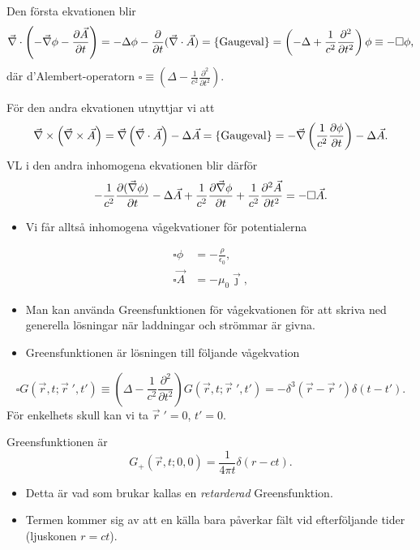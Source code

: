\documentclass[%
oneside,                 %
final,                   %
10pt]{article}
\begin{document}
\noindent
Den första ekvationen blir
$$
\vec{\nabla} \cdot \left(-\vec{\nabla} \phi - \frac{\partial \vec{A}}{\partial t} \right) = -\Delta \phi - \frac{\partial}{\partial t} (\vec{\nabla} \cdot \vec{A}) = \left\{ \mathrm{Gaugeval} \right\} = \left( -\Delta + \frac{1}{c^2} \frac{\partial^2}{\partial t^2} \right) \phi \equiv - \square \phi,
$$
där d'Alembert-operatorn $\square \equiv \left( \Delta - \frac{1}{c^2} \frac{\partial^2}{\partial t^2} \right)$.

För den andra ekvationen utnyttjar vi att
$$
\vec{\nabla} \times \left( \vec{\nabla} \times \vec{A} \right) = \vec{\nabla} \left( \vec{\nabla} \cdot \vec{A} \right) - \Delta \vec{A} = \left\{ \mathrm{Gaugeval} \right\} = -\vec{\nabla} \left( \frac{1}{c^2} \frac{\partial \phi}{\partial t} \right) - \Delta \vec{A}.
$$
VL i den andra inhomogena ekvationen blir därför
$$ 
-\frac{1}{c^2} \frac{\partial (\vec{\nabla} \phi)}{\partial t} - \Delta \vec{A} + \frac{1}{c^2}
\frac{\partial \vec{\nabla} \phi}{\partial t} + \frac{1}{c^2} \frac{\partial^2 \vec{A}}{\partial  t^2} = -\square \vec{A}.
$$

\begin{itemize}
\item Vi får alltså inhomogena vågekvationer för potentialerna
\end{itemize}

\noindent
\begin{align*}
\square\phi&=-\frac{\rho}{\epsilon_0}, \\
\square\vec A&=-\mu_0\vec\jmath ,
\end{align*}
\begin{itemize}
\item Man kan använda Greensfunktionen för vågekvationen för att skriva ned generella lösningar när laddningar och strömmar är givna.

\item Greensfunktionen är lösningen till följande vågekvation
\end{itemize}

\noindent
$$
\square G(\vec{r},t;\vec{r}{\;}',t') \equiv (\Delta - \frac{1}{c^2} \frac{\partial^2}{\partial t^2}) G(\vec{r},t;\vec{r}{\;}',t') = -\delta^3(\vec{r}-\vec{r}{\;}')\delta(t-t').
$$
För enkelhets skull kan vi ta $\vec{r}{\;}'=0$, $t'=0$.

Greensfunktionen är
$$
G_+(\vec{r},t;0,0) = \frac{1}{4\pi t} \delta(r-ct).
$$  
\begin{itemize}
\item Detta är vad som brukar kallas en \emph{retarderad} Greensfunktion. 

\item Termen kommer sig av att en källa bara påverkar fält vid efterföljande tider (ljuskonen $r=ct$).
\end{itemize}
\end{document}
